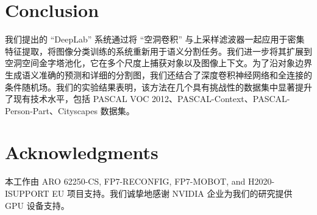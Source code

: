 \section{Conclusion}
我们提出的 ``DeepLab'' 系统通过将 ``空洞卷积'' 与上采样滤波器一起应用于密集特征提取，将图像分类训练的系统重新用于语义分割任务。我们进一步将其扩展到空洞空间金字塔池化，它在多个尺度上捕获对象以及图像上下文。为了沿对象边界生成语义准确的预测和详细的分割图，我们还结合了深度卷积神经网络和全连接的条件随机场。我们的实验结果表明，该方法在几个具有挑战性的数据集中显著提升了现有技术水平，包括 PASCAL VOC 2012、PASCAL-Context、PASCAL-Person-Part、Cityscapes 数据集。

\section*{Acknowledgments}
本工作由 ARO 62250-CS, FP7-RECONFIG, FP7-MOBOT, and H2020-ISUPPORT EU 项目支持。我们诚挚地感谢 NVIDIA 企业为我们的研究提供 GPU 设备支持。
